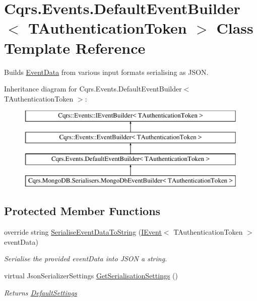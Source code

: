 \hypertarget{classCqrs_1_1Events_1_1DefaultEventBuilder}{}\section{Cqrs.\+Events.\+Default\+Event\+Builder$<$ T\+Authentication\+Token $>$ Class Template Reference}
\label{classCqrs_1_1Events_1_1DefaultEventBuilder}


Builds \hyperlink{classCqrs_1_1Events_1_1EventData}{Event\+Data} from various input formats serialising as J\+S\+ON.  


Inheritance diagram for Cqrs.\+Events.\+Default\+Event\+Builder$<$ T\+Authentication\+Token $>$\+:\begin{figure}[H]
\begin{center}
\leavevmode
\includegraphics[height=4.000000cm]{classCqrs_1_1Events_1_1DefaultEventBuilder}
\end{center}
\end{figure}
\subsection*{Protected Member Functions}
\begin{DoxyCompactItemize}
\item 
override string \hyperlink{classCqrs_1_1Events_1_1DefaultEventBuilder_afb73a13003a94135e5c97436e7e78e13_afb73a13003a94135e5c97436e7e78e13}{Serialise\+Event\+Data\+To\+String} (\hyperlink{interfaceCqrs_1_1Events_1_1IEvent}{I\+Event}$<$ T\+Authentication\+Token $>$ event\+Data)
\begin{DoxyCompactList}\small\item\em Serialise the provided {\itshape event\+Data}  into J\+S\+ON a string. \end{DoxyCompactList}\item 
virtual Json\+Serializer\+Settings \hyperlink{classCqrs_1_1Events_1_1DefaultEventBuilder_a49be2758fa32166f1b95e8c0eb9355d1_a49be2758fa32166f1b95e8c0eb9355d1}{Get\+Serialisation\+Settings} ()
\begin{DoxyCompactList}\small\item\em Returns \hyperlink{classCqrs_1_1Events_1_1DefaultEventBuilder_aabead59863bacfed527d85ea789ab881_aabead59863bacfed527d85ea789ab881}{Default\+Settings} \end{DoxyCompactList}\end{DoxyCompactItemize}
